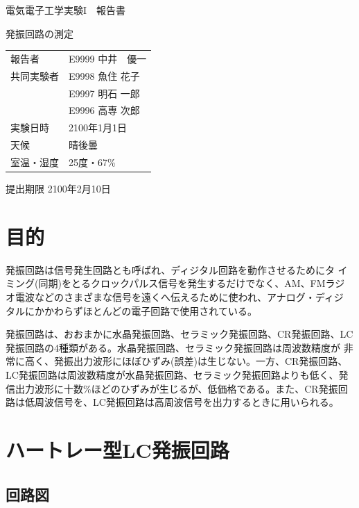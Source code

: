 \documentclass[a4paper,uplatex]{jsarticle}
\begin{document}
{\Large 
\begin{center}
電気電子工学実験I　報告書
\vspace*{50mm}

\textsf{\Huge 発振回路の測定}

\vspace*{80mm}

\begin{tabular}{p{40mm}l}
報告者 & E9999 中井　優一\\
共同実験者 & E9998 魚住 花子\\
 & E9997 明石 一郎\\
 & E9996 高専 次郎\\
実験日時 & 2100年1月1日\\
天候 & 晴後曇\\
室温・湿度 & 25度・67\%\\
\end{tabular}
\vspace*{40mm}


 提出期限 2100年2月10日
\end{center}
}


\newpage
\setcounter{page}{1}

\section{目的}

発振回路は信号発生回路とも呼ばれ、ディジタル回路を動作させるためにタ
イミング(同期)をとるクロックパルス信号を発生するだけでなく、AM、FMラジ
オ電波などのさまざまな信号を遠くへ伝えるために使われ、アナログ・ディジ
タルにかかわらずほとんどの電子回路で使用されている。

発振回路は、おおまかに水晶発振回路、セラミック発振回路、CR発振回路、LC
発振回路の4種類がある。水晶発振回路、セラミック発振回路は周波数精度が
非常に高く、発振出力波形にほぼひずみ(誤差)は生じない。一方、CR発振回路、
LC発振回路は周波数精度が水晶発振回路、セラミック発振回路よりも低く、発
信出力波形に十数\%ほどのひずみが生じるが、低価格である。また、CR発振回
路は低周波信号を、LC発振回路は高周波信号を出力するときに用いられる。

\section{ハートレー型LC発振回路}

\subsection{回路図}
\end{document}
